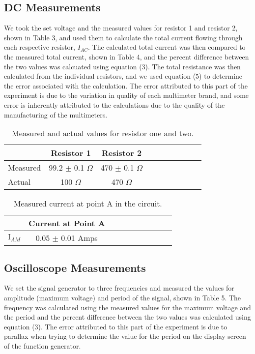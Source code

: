 \documentclass[twoside,10pt]{article}
\begin{document}
\begin{multicols}{2}
		
		\subsection{DC Measurements}
			We took the set voltage and the measured values for resistor 1 and resistor 2, shown in Table 3, and used them to calculate the total current flowing through each respective resistor, $I_{AC}$. The calculated total current was then compared to the measured total current, shown in Table 4, and the percent difference between the two values was calcuated using equation (3). The total resistance was then calculated from the individual resistors, and we used equation (5) to determine the error associated with the calculation. The error attributed to this part of the experiment is due to the variation in quality of each multimeter brand, and some error is inherently attributed to the calculations due to the quality of the manufacturing of the multimeters. 
	
	
				\begin{table}[H]
			\centering
			\begin{tabular}{l c c rrrrrrr}
				\hline \hline
				& Resistor 1 & Resistor 2 \\ [1ex]
				\hline
				Measured & 99.2 $\pm$ 0.1 $\Omega$ & 470 $\pm$ 0.1 $\Omega$ \\
				Actual & 100 $\Omega$  & 470 $\Omega$ \\ [1.5ex]
				\hline
			\end{tabular}
			\caption{Measured and actual values for resistor one and two.}
		\end{table}
		
			\begin{table}[H]
			\centering
			\begin{tabular}{l c c rrrrrrr}
				\hline \hline
				& Current at Point A \\ [1ex]
				\hline
				$\text{I}_{AM}$ & 0.05 $\pm$ 0.01 Amps \\ [1.5ex]
				\hline
			\end{tabular}
			\caption{Measured current at point A in the circuit.}
		\end{table}
				
					
		
		\subsection{Oscilloscope Measurements}
		We set the signal generator to three frequencies and measured the values for amplitude (maximum voltage) and period of the signal, shown in Table 5. The frequency was calculated using the measured values for the maximum voltage and the period and the percent difference between the two values was calculated using equation (3). The error attributed to this part of the experiment is due to parallax when trying to determine the value for the period on the display screen of the function generator. 


\end{multicols}
\end{document}
